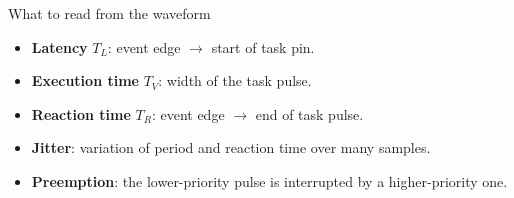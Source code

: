 \begin{frame}{What to read from the waveform}
  \begin{itemize}
    \item \textbf{Latency} $T_L$: event edge $\rightarrow$ start of task pin.
    \item \textbf{Execution time} $T_V$: width of the task pulse.
    \item \textbf{Reaction time} $T_R$: event edge $\rightarrow$ end of task pulse.
    \item \textbf{Jitter}: variation of period and reaction time over many samples.
    \item \textbf{Preemption}: the lower-priority pulse is interrupted by a higher-priority one.
  \end{itemize}
\end{frame}
